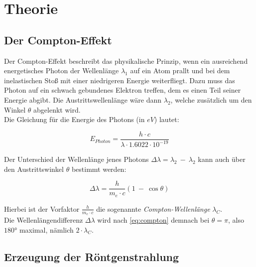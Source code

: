 \section{Theorie}
\label{sec:Theorie}

\subsection{Der Compton-Effekt}

Der Compton-Effekt beschreibt das physikalische Prinzip, wenn ein ausreichend energetisches Photon der Wellenlänge $\lambda_1$ auf ein Atom prallt und bei dem inelastischen Stoß mit einer niedrigeren Energie weiterfliegt.
Dazu muss das Photon auf ein schwach gebundenes Elektron treffen, dem es einen Teil seiner Energie abgibt.
Die Austrittswellenlänge wäre dann $\lambda_2$, welche zusätzlich um den Winkel $\theta$ abgelenkt wird.\\
Die Gleichung für die Energie des Photons (in $eV$) lautet:

\begin{equation}
    E_{Photon} = \frac{h\cdot c}{\lambda \cdot 1.6022\cdot 10^{-19}}
    \label{eq:enrgy}
\end{equation}

Der Unterschied der Wellenlänge jenes Photons $\Delta \lambda = \lambda_2\ -\ \lambda_2$ kann auch über den Austrittswinkel $\theta$ bestimmt werden:

\begin{equation}
    \Delta \lambda = \frac{h}{m_e\cdot c}(1\ -\ \cos{\theta})
    \label{eq:compton}
\end{equation}

Hierbei ist der Vorfaktor $\frac{h}{m_e\cdot c}$ die sogenannte \textit{Compton-Wellenlänge} $\lambda_C$.\\
Die Wellenlängendifferenz $\Delta \lambda$ wird nach \autoref{eq:compton} demnach bei $\theta = \pi$, also $180°$ maximal, nämlich $2\cdot \lambda_C$.

\subsection{Erzeugung der Röntgenstrahlung}

